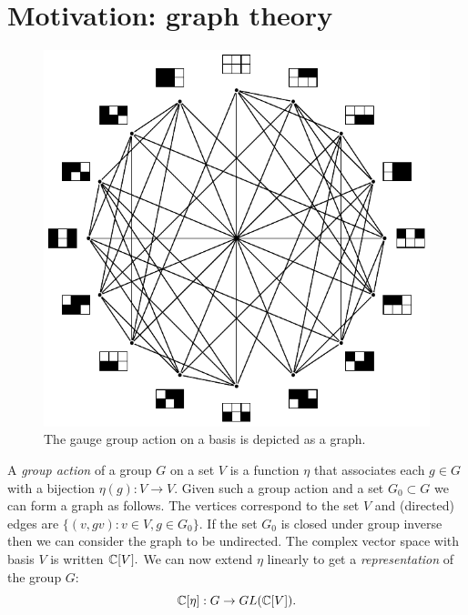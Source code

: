 \documentclass[12pt]{article}
\begin{document}
%
%

\section{Motivation: graph theory}

\begin{figure}[th!]
\begin{center}
        \includegraphics[width=0.5\columnwidth]{fig_symmetry.pdf}
\caption{
The gauge group action on a basis is depicted as a graph.
}
\label{fig_compass}
\end{center}
\end{figure}

\def\rhoreg{\rho_\mathrm{reg}}

A {\it group action} 
of a group $G$ on a set $V$
is a function $\eta$ that associates
each $g\in G$ with a bijection $\eta(g):V\to V.$
Given such a group action and a
set $G_0\subset G$ we can form a graph as
follows.
The vertices correspond to the set $V$ and
(directed) edges are  $\{(v, gv) : v \in V, g \in G_0\}.$
If the set $G_0$ is closed under group inverse then
we can consider the graph to be undirected.
The complex vector space with basis $V$ is written $\mathbb{C}[V].$
We can now extend $\eta$ linearly to get a {\it representation} of
the group $G$:
$$
    \mathbb{C}[\eta] : G \to GL(\mathbb{C}[V]).
$$
\end{document}
